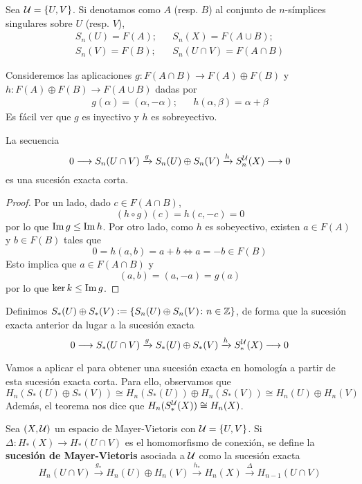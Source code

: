Sea $\mathcal{U}=\{U,V\}$. Si denotamos como $A$ (resp. $B$) al conjunto de
$n$-símplices singulares sobre $U$ (resp. $V$),
\begin{align*}
S_n(U)=F(A);	&& 	S_n(X)=F(A\cup B);\\
S_n(V)=F( B);	&&	S_n(U\cap V)=F(A \cap B)
\end{align*}

Consideremos las aplicaciones $g\colon F(A\cap B) \to F(A)\oplus F(B)$ y
$h\colon F(A)\oplus F(B) \to F(A\cup B)$ dadas por
\begin{align*}
g(\alpha)=(\alpha,-\alpha); && h(\alpha,\beta)=\alpha+\beta
\end{align*}
Es fácil ver que $g$ es inyectivo y $h$ es sobreyectivo.

\begin{proposition}
La secuencia
\[0 \longrightarrow S_n(U \cap V) \xrightarrow{ g } S_n(U)\oplus S_n(V)
\xrightarrow{ h } S_n^{\mathcal{U}}(X) \longrightarrow 0\]
es una sucesión exacta corta.
\end{proposition}

\begin{proof}
Por un lado, dado $c\in F(A\cap B)$,
\[(h\circ g)(c)=h(c,-c)=0\]
por lo que $\operatorname{Im} g \leq \operatorname{Im} h$. Por otro lado, como $h$ es sobeyectivo,
existen $a \in F(A)$ y $b \in F(B)$ tales que
\[0=h(a,b)=a+b \iff a=-b \in F(B)\]
Esto implica que $a \in F(A\cap B)$ y
\[(a,b)=(a,-a)=g(a)\]
por lo que $\ker k \leq \operatorname{Im} g$.
\end{proof}

Definimos $S_*(U)\oplus S_*(V):=\{S_n(U)\oplus S_n(V)\colon
n \in \mathbb{Z}\}$, de forma que la sucesión exacta anterior da lugar a la
sucesión exacta
\[0 \longrightarrow S_*(U \cap V) \xrightarrow{ g } S_*(U)\oplus S_*(V)
\xrightarrow{ h } S^{\mathcal{U}}_*(X) \longrightarrow 0\]

Vamos a aplicar el  para obtener una sucesión exacta
en homología a partir de esta sucesión exacta corta. Para ello, observamos
que
\[H_n(S_*(U)\oplus S_*(V))\cong H_n(S_*(U))\oplus H_n(S_*(V))\cong
H_n(U)\oplus H_n(V)\]
Además, el teorema  nos dice que $H_n(S^{\mathcal{U}}_*(X)) \cong
H_n(X)$.

\begin{definition}
Sea $(X,\mathcal{U})$ un espacio de Mayer-Vietoris con $\mathcal{U}=\{U,V\}$. Si
$\Delta\colon H_*(X) \to H_*(U \cap V)$ es el homomorfismo de conexión,
se define la \textbf{sucesión de Mayer-Vietoris} asociada a $\mathcal{U}$ como
la sucesión exacta
\[H_n(U \cap V) \xrightarrow{ g_* } H_n(U)\oplus H_n(V)
\xrightarrow{ h_* } H_n(X) \xrightarrow{ \Delta } H_{n-1}(U \cap V)\]
\end{definition}

